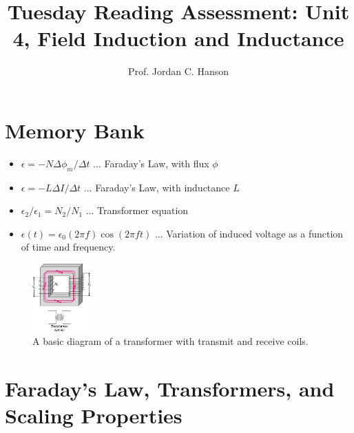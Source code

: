 \documentclass{article}
\begin{document}
\title{Tuesday Reading Assessment: Unit 4, Field Induction and Inductance}
\author{Prof. Jordan C. Hanson}

\maketitle

\section{Memory Bank}

\begin{itemize}
\item $\epsilon = -N \Delta \phi_m /\Delta t$ ... Faraday's Law, with flux $\phi$
\item $\epsilon = -L \Delta I/\Delta t$ ... Faraday's Law, with inductance $L$
\item $\epsilon_2/\epsilon_1 = N_2/N_1$ ... Transformer equation
\item $\epsilon(t) = \epsilon_0 (2 \pi f) \cos(2\pi ft)$ ... Variation of induced voltage as a function of time and frequency.
\end{itemize}

\begin{figure}[hb]
\centering
\includegraphics[width=0.2\textwidth]{transformer.jpeg}
\caption{\label{fig:trans} A basic diagram of a transformer with transmit and receive coils.}
\end{figure}

\section{Faraday's Law, Transformers, and Scaling Properties}
\end{document}
